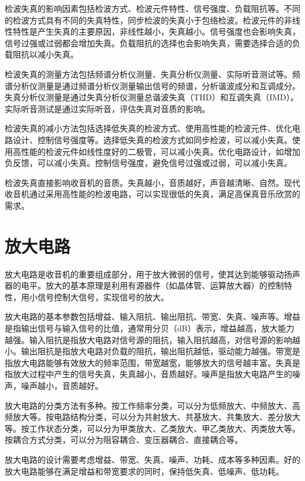 \documentclass[12pt,UTF8]{ctexbook}
\begin{document}
检波失真的影响因素包括检波方式、检波元件特性、信号强度、负载阻抗等。不同的检波方式具有不同的失真特性，同步检波的失真小于包络检波。检波元件的非线性特性是产生失真的主要原因，非线性越小，失真越小。信号强度也会影响失真，信号过强或过弱都会增加失真。负载阻抗的选择也会影响失真，需要选择合适的负载阻抗以减小失真。

检波失真的测量方法包括频谱分析仪测量、失真分析仪测量、实际听音测试等。频谱分析仪测量是通过频谱分析仪测量输出信号的频谱，分析谐波成分和互调成分。失真分析仪测量是通过失真分析仪测量总谐波失真（THD）和互调失真（IMD）。实际听音测试是通过实际听音，评估失真对音质的影响。

检波失真的减小方法包括选择低失真的检波方式、使用高性能的检波元件、优化电路设计、控制信号强度等。选择低失真的检波方式如同步检波，可以减小失真。使用高性能的检波元件如线性度好的二极管，可以减小失真。优化电路设计，如增加负反馈，可以减小失真。控制信号强度，避免信号过强或过弱，可以减小失真。

检波失真直接影响收音机的音质。失真越小，音质越好，声音越清晰、自然。现代收音机通过采用高性能的检波电路，可以实现很低的失真，满足高保真音乐欣赏的需求。

\chapter{放大电路}

放大电路是收音机的重要组成部分，用于放大微弱的信号，使其达到能够驱动扬声器的电平。放大的基本原理是利用有源器件（如晶体管、运算放大器）的控制特性，用小信号控制大信号，实现信号的放大。

放大电路的基本参数包括增益、输入阻抗、输出阻抗、带宽、失真、噪声等。增益是指输出信号与输入信号的比值，通常用分贝（dB）表示，增益越高，放大能力越强。输入阻抗是指放大电路对信号源的阻抗，输入阻抗越高，对信号源的影响越小。输出阻抗是指放大电路对负载的阻抗，输出阻抗越低，驱动能力越强。带宽是指放大电路能够有效放大的频率范围，带宽越宽，能够放大的信号越丰富。失真是指放大过程中产生的信号失真，失真越小，音质越好。噪声是指放大电路产生的噪声，噪声越小，音质越好。

放大电路的分类方法有多种。按工作频率分类，可以分为低频放大、中频放大、高频放大等。按电路结构分类，可以分为共射放大、共基放大、共集放大、差分放大等。按工作状态分类，可以分为甲类放大、乙类放大、甲乙类放大、丙类放大等。按耦合方式分类，可以分为阻容耦合、变压器耦合、直接耦合等。

放大电路的设计需要考虑增益、带宽、失真、噪声、功耗、成本等多种因素。好的放大电路能够在满足增益和带宽要求的同时，保持低失真、低噪声、低功耗。
\end{document}
